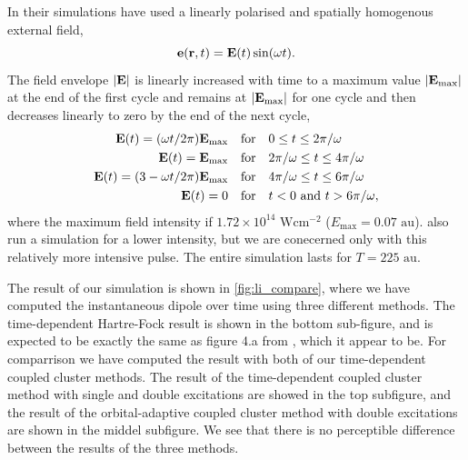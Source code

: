 In their simulations \citeauthor{li2005time} have used a linearly polarised and 
spatially homogenous external field, 
\begin{equation}
    \vb{e}(\vb{r}, t) = \vb{E}(t)\sin(\omega t).
\end{equation}
The field envelope $|\vb{E}|$ is linearly increased with time to a maximum value 
$|\vb{E}_\text{max}|$ at the end of the first cycle and remains at $|\vb{E}_\text{max}|$
for one cycle and then decreases linearly to zero by the end of the next cycle,
\begin{equation}
    \begin{aligned}
        \vb{E}(t) = (\omega t / 2\pi) \vb{E}_\text{max} \quad &\text{for} \quad
            0 \leq t \leq 2\pi / \omega \\ 
        \vb{E}(t) = \vb{E}_\text{max} \quad &\text{for} \quad 
            2\pi / \omega \leq t \leq 4\pi / \omega \\ 
        \vb{E}(t) = (3 - \omega t / 2\pi) \vb{E}_\text{max} \quad &\text{for} \quad 
            4\pi / \omega \leq t \leq 6\pi / \omega \\
        \vb{E}(t) = 0 \quad &\text{for} \quad
            t < 0 \text{ and } t > 6\pi / \omega,
    \end{aligned}
\end{equation}
where the maximum field intensity if $1.72\times10^14 \text{ W} \text{cm}^{-2}$ 
($E_\text{max} = 0.07 \text{ au}$). \citeauthor{li2005time} also run a simulation 
for a lower intensity, but we are conecerned only with this relatively more intensive 
pulse. The entire simulation lasts for $T=225 \text{ au}$.

The result of our simulation is shown in \autoref{fig:li_compare}, where we have 
computed the instantaneous dipole over time using three different methods. The 
time-dependent Hartre-Fock result is shown in the bottom sub-figure, and is expected 
to be exactly the same as figure 4.a from \citeauthor{li2005time}\cite{li2005time},
which it appear to be. For comparrison we have computed the result with both of 
our time-dependent coupled cluster methods. The result of the time-dependent 
coupled cluster method with single and double excitations are showed in the top subfigure,
and the result of the orbital-adaptive coupled cluster method with double excitations 
are shown in the middel subfigure. We see that there is no perceptible difference between 
the results of the three methods.

